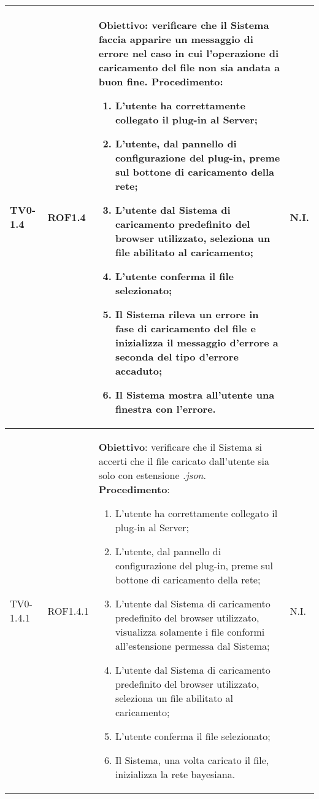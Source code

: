 \begin{longtable}{|C{.15\textwidth}|C{.13\textwidth}|m{.52\textwidth}|C{.08\textwidth}|}
TV0-1.4 & ROF1.4 &
	\textbf{Obiettivo}: verificare che il Sistema faccia apparire un messaggio di errore nel caso in cui l'operazione di caricamento del file non sia andata a buon fine. \newline
	\textbf{Procedimento}:
	\begin{enumerate}
		\item L'utente ha correttamente collegato il plug-in al Server;
		\item L'utente, dal pannello di configurazione del plug-in, preme sul bottone di caricamento della rete;
		\item L'utente dal Sistema di caricamento predefinito del browser utilizzato, seleziona un file abilitato al caricamento;
		\item L'utente conferma il file selezionato;
		\item Il Sistema rileva un errore in fase di caricamento del file e inizializza il messaggio d'errore a seconda del tipo d'errore accaduto;
		\item Il Sistema mostra all'utente una finestra con l'errore.
	\end{enumerate}
	& N.I. \\
\hline

 TV0-1.4.1 & ROF1.4.1 &
	\textbf{Obiettivo}: verificare che il Sistema si accerti che il file caricato dall'utente sia solo con estensione \textit{.json}. \newline
	\textbf{Procedimento}:
	\begin{enumerate}
		\item L'utente ha correttamente collegato il plug-in al Server;
		\item L'utente, dal pannello di configurazione del plug-in, preme sul bottone di caricamento della rete;
		\item L'utente dal Sistema di caricamento predefinito del browser utilizzato, visualizza solamente i file conformi all'estensione permessa dal Sistema;
		\item L'utente dal Sistema di caricamento predefinito del browser utilizzato, seleziona un file abilitato al caricamento;
		\item L'utente conferma il file selezionato;
		\item Il Sistema, una volta caricato il file, inizializza la rete bayesiana.
	\end{enumerate}
	& N.I. \\
\hline


\end{longtable}
